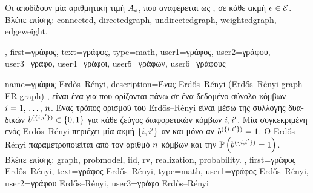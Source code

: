 {{\begin{figure}[H]
		\end{figure}
		\foreignlanguage{greek}{Οι}  \foreignlanguage{greek}{αποδίδουν μία αριθμητική τιμή $A_{e}$, 
		που αναφέρεται ως} , \foreignlanguage{greek}{σε κάθε ακμή} $e \in \mathcal{E}$.		
		\\
		\foreignlanguage{greek}{Βλέπε επίσης:} \gls{connected}, \gls{directedgraph}, \gls{undirectedgraph}, \gls{weightedgraph}, \gls{edgeweight}.},
	first={\foreignlanguage{greek}{γράφος}},
	text={\foreignlanguage{greek}{γράφος}},
	type=math,
	user1={\foreignlanguage{greek}{γράφος}}, %
  	user2={\foreignlanguage{greek}{γράφου}}, %
	user3={\foreignlanguage{greek}{γράφο}}, %
	user4={\foreignlanguage{greek}{γράφοι}}, %
	user5={\foreignlanguage{greek}{γράφων}}, %
	user6={\foreignlanguage{greek}{γράφους}} %
}

{name={\foreignlanguage{greek}{γράφος} Erd\H{o}s–R\'enyi},
	description={\foreignlanguage{greek}{Ένας}  Erd\H{o}s–R\'enyi 
		(Erd\H{o}s–R\'enyi graph - ER graph) \cite{erdds1959random}, \cite{gilbert1959random} \foreignlanguage{greek}{είναι ένα}
            	 \foreignlanguage{greek}{για}  \foreignlanguage{greek}{που ορίζονται πάνω σε ένα δεδομένο 
		σύνολο κόμβων $i=1, \,\ldots, \,n$. Ένας τρόπος ορισμού του}  Erd\H{o}s–R\'enyi 
		\foreignlanguage{greek}{είναι μέσω της συλλογής}  \foreignlanguage{greek}{δυαδικών}  
		$b^{(\{i,i'\})} \in \{0,1\}$ \foreignlanguage{greek}{για κάθε ζεύγος διαφορετικών κόμβων $i, i'$. 
		Μία συγκεκριμένη}  \foreignlanguage{greek}{ενός}  Erd\H{o}s–R\'enyi 
		\foreignlanguage{greek}{περιέχει μία ακμή $\{i,i'\}$ αν και μόνο αν $b^{(\{i,i'\})}=1$. 
		Ο}  Erd\H{o}s–R\'enyi \foreignlanguage{greek}{παραμετροποιείται από τον αριθμό $n$ κόμβων 
		και την}  $\mathbb{P}\left(b^{(\{i,i'\})}=1\right)$.	
		\\
		\foreignlanguage{greek}{Βλέπε επίσης:} \gls{graph}, \gls{probmodel}, \gls{iid}, \gls{rv}, \gls{realization}, \gls{probability}. },
	first={\foreignlanguage{greek}{γράφος} Erd\H{o}s–R\'enyi},
	text={\foreignlanguage{greek}{γράφος} Erd\H{o}s–R\'enyi},
	type=math,
	user1={\foreignlanguage{greek}{γράφος} Erd\H{o}s–R\'enyi}, %
  	user2={\foreignlanguage{greek}{γράφου} Erd\H{o}s–R\'enyi}, %
	user3={\foreignlanguage{greek}{γράφο} Erd\H{o}s–R\'enyi} %
}

